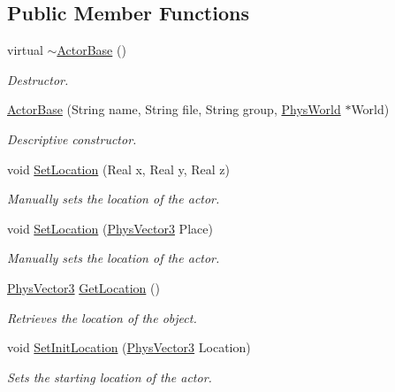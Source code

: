 \subsection*{Public Member Functions}
\begin{DoxyCompactItemize}
\item 
virtual \hyperlink{classActorBase_a6fd984c46b3232c2522adb44be4dedb7}{$\sim$ActorBase} ()
\begin{DoxyCompactList}\small\item\em Destructor. \item\end{DoxyCompactList}\item 
\hyperlink{classActorBase_a32337e36f62d5ffb6315fad932aa84d9}{ActorBase} (String name, String file, String group, \hyperlink{classPhysWorld}{PhysWorld} $\ast$World)
\begin{DoxyCompactList}\small\item\em Descriptive constructor. \item\end{DoxyCompactList}\item 
void \hyperlink{classActorBase_a693c1bcb10ba7dc8fc37eef70ce65f0c}{SetLocation} (Real x, Real y, Real z)
\begin{DoxyCompactList}\small\item\em Manually sets the location of the actor. \item\end{DoxyCompactList}\item 
void \hyperlink{classActorBase_a2a204add0b036de441ebd59d14939000}{SetLocation} (\hyperlink{classPhysVector3}{PhysVector3} Place)
\begin{DoxyCompactList}\small\item\em Manually sets the location of the actor. \item\end{DoxyCompactList}\item 
\hyperlink{classPhysVector3}{PhysVector3} \hyperlink{classActorBase_a9dfdaf0304e4a462b3b033fb254116af}{GetLocation} ()
\begin{DoxyCompactList}\small\item\em Retrieves the location of the object. \item\end{DoxyCompactList}\item 
void \hyperlink{classActorBase_ac118fc21f89d067d987d511b444f7d55}{SetInitLocation} (\hyperlink{classPhysVector3}{PhysVector3} Location)
\begin{DoxyCompactList}\small\item\em Sets the starting location of the actor. \item\end{DoxyCompactList}\item 

\end{DoxyCompactItemize}
